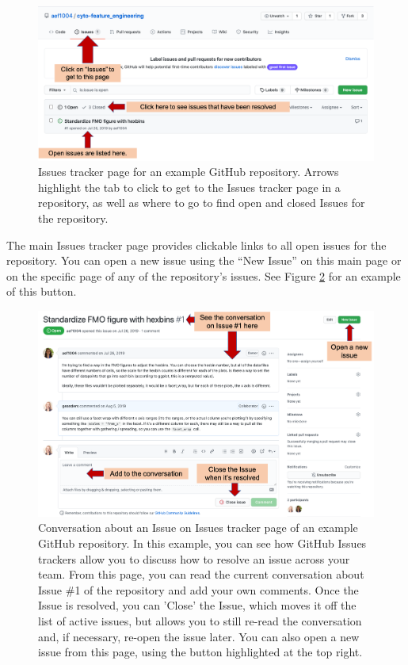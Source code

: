 \documentclass[]{tufte-book}
\begin{document}
\begin{figure}
\includegraphics[width=\textwidth]{figures/github_issues} \caption[Issues tracker page for an example GitHub repository]{Issues tracker page for an example GitHub repository. Arrows highlight the tab to click to get to the Issues tracker page in a repository, as well as where to go to find open and closed Issues for the repository.}\label{fig:githubissues1}
\end{figure}

The main Issues tracker page provides clickable links to all open issues for
the repository. You can open a new issue using the ``New Issue'' on this main
page or on the specific page of any of the repository's issues. See Figure
\ref{fig:githubissues2} for an example of this button.

\begin{figure}
\includegraphics[width=\textwidth]{figures/github_issues2} \caption[Conversation about an Issue on Issues tracker page of an example GitHub repository]{Conversation about an Issue on Issues tracker page of an example GitHub repository. In this example, you can see how GitHub Issues trackers allow you to discuss how to resolve an issue across your team. From this page, you can read the current conversation about Issue \#1 of the repository and add your own comments. Once the Issue is resolved, you can 'Close' the Issue, which moves it off the list of active issues, but allows you to still re-read the conversation and, if necessary, re-open the issue later. You can also open a new issue from this page, using the button highlighted at the top right.}\label{fig:githubissues2}
\end{figure}
\end{document}

